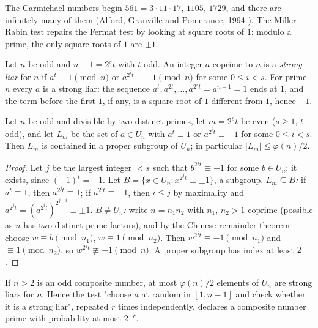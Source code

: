 The Carmichael numbers begin $561 = 3 \cdot 11 \cdot 17$, $1105$, $1729$, and there are infinitely many of them (Alford, Granville and Pomerance, 1994 \cite{alford-granville-pomerance}). The Miller--Rabin
test repairs the Fermat test by looking at square roots of $1$: modulo a prime, the only square roots of $1$ are $\pm1$.

\begin{definition}\label{cryptography:definition-strong-liar}
Let $n$ be odd and $n - 1 = 2^st$ with $t$ odd. An integer $a$ coprime to $n$ is a \emph{strong liar} for $n$ if $a^t \equiv 1 \pmod n$ or $a^{2^it} \equiv -1 \pmod n$ for some $0 \leq i < s$. For prime $n$ every
$a$ is a strong liar: the sequence $a^t, a^{2t}, \dots, a^{2^st} = a^{n-1} = 1$ ends at $1$, and the term before the first $1$, if any, is a square root of $1$ different from $1$, hence $-1$.
\end{definition}

\begin{lemma}\label{cryptography:lemma-square-roots}
Let $n$ be odd and divisible by two distinct primes, let $m = 2^st$ be even ($s \geq 1$, $t$ odd), and let $L_m$ be the set of $a \in U_n$ with $a^t \equiv 1$ or $a^{2^it} \equiv -1$ for some $0 \leq i < s$. Then $L_m$ is contained in
a proper subgroup of $U_n$; in particular $|L_m| \leq \varphi(n)/2$.
\end{lemma}

\begin{proof}
Let $j$ be the largest integer $< s$ such that $b^{2^jt} \equiv -1$ for some $b \in U_n$; it exists, since $(-1)^t = -1$. Let $B = \{x \in U_n : x^{2^jt} \equiv \pm1\}$, a subgroup. \emph{$L_m \subseteq B$:} if
$a^t \equiv 1$, then $a^{2^jt} \equiv 1$; if $a^{2^it} \equiv -1$, then $i \leq j$ by maximality and $a^{2^jt} = (a^{2^it})^{2^{j-i}} \equiv \pm1$. \emph{$B \neq U_n$:} write $n = n_1n_2$ with $n_1$, $n_2 > 1$ coprime
(possible as $n$ has two distinct prime factors), and by the Chinese remainder theorem choose $w \equiv b \pmod{n_1}$, $w \equiv 1 \pmod{n_2}$. Then $w^{2^jt} \equiv -1 \pmod{n_1}$ and $\equiv 1 \pmod{n_2}$, so
$w^{2^jt} \not\equiv \pm1 \pmod n$. A proper subgroup has index at least $2$.
\end{proof}

\begin{theorem}\label{cryptography:theorem-miller-rabin}
If $n > 2$ is an odd composite number, at most $\varphi(n)/2$ elements of $U_n$ are strong liars for $n$. Hence the test "choose $a$ at random in $[1, n - 1]$ and check whether it is a strong liar", repeated $r$
times independently, declares a composite number prime with probability at most $2^{-r}$.
\end{theorem}

